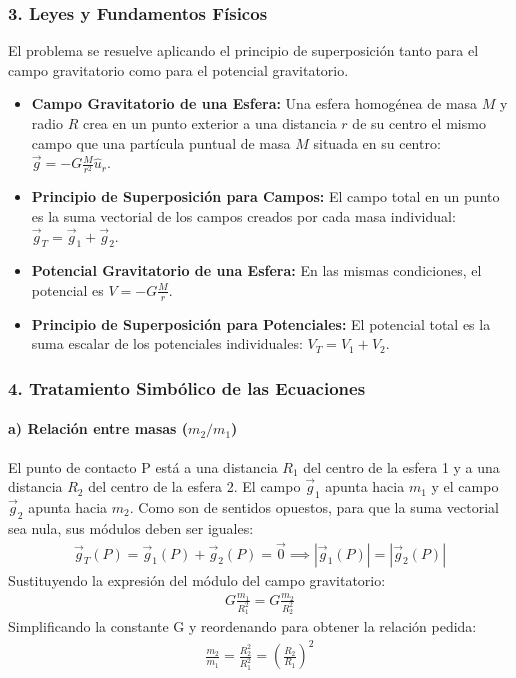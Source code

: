 \subsubsection*{3. Leyes y Fundamentos Físicos}
El problema se resuelve aplicando el principio de superposición tanto para el campo gravitatorio como para el potencial gravitatorio.
\begin{itemize}
    \item \textbf{Campo Gravitatorio de una Esfera:} Una esfera homogénea de masa $M$ y radio $R$ crea en un punto exterior a una distancia $r$ de su centro el mismo campo que una partícula puntual de masa $M$ situada en su centro: $\vec{g} = -G \frac{M}{r^2} \hat{u}_r$.
    \item \textbf{Principio de Superposición para Campos:} El campo total en un punto es la suma vectorial de los campos creados por cada masa individual: $\vec{g}_T = \vec{g}_1 + \vec{g}_2$.
    \item \textbf{Potencial Gravitatorio de una Esfera:} En las mismas condiciones, el potencial es $V = -G \frac{M}{r}$.
    \item \textbf{Principio de Superposición para Potenciales:} El potencial total es la suma escalar de los potenciales individuales: $V_T = V_1 + V_2$.
\end{itemize}

\subsubsection*{4. Tratamiento Simbólico de las Ecuaciones}
\paragraph*{a) Relación entre masas ($m_2/m_1$)}
El punto de contacto P está a una distancia $R_1$ del centro de la esfera 1 y a una distancia $R_2$ del centro de la esfera 2. El campo $\vec{g}_1$ apunta hacia $m_1$ y el campo $\vec{g}_2$ apunta hacia $m_2$. Como son de sentidos opuestos, para que la suma vectorial sea nula, sus módulos deben ser iguales:
\begin{gather}
    \vec{g}_T(P) = \vec{g}_1(P) + \vec{g}_2(P) = \vec{0} \implies |\vec{g}_1(P)| = |\vec{g}_2(P)|
\end{gather}
Sustituyendo la expresión del módulo del campo gravitatorio:
\begin{gather}
    G \frac{m_1}{R_1^2} = G \frac{m_2}{R_2^2}
\end{gather}
Simplificando la constante G y reordenando para obtener la relación pedida:
\begin{gather}
    \frac{m_2}{m_1} = \frac{R_2^2}{R_1^2} = \left(\frac{R_2}{R_1}\right)^2
\end{gather}
